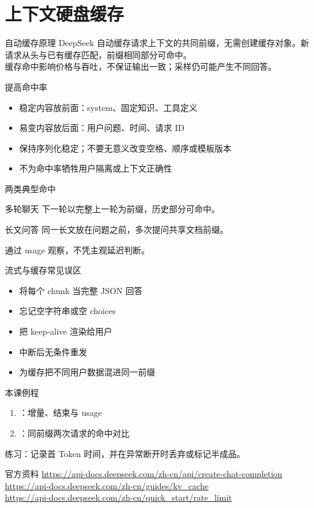 \documentclass[aspectratio=169,UTF8]{ctexbeamer}
\begin{document}
\section{上下文硬盘缓存}
\begin{frame}{自动缓存原理}
DeepSeek 自动缓存请求上下文的共同前缀，无需创建缓存对象。新请求从头与已有缓存匹配，前缀相同部分可命中。\\[8pt]
缓存命中影响价格与吞吐，不保证输出一致；采样仍可能产生不同回答。
\end{frame}
\begin{frame}{提高命中率}
\begin{itemize}
  \item 稳定内容放前面：system、固定知识、工具定义
  \item 易变内容放后面：用户问题、时间、请求 ID
  \item 保持序列化稳定；不要无意义改变空格、顺序或模板版本
  \item 不为命中率牺牲用户隔离或上下文正确性
\end{itemize}
\end{frame}
\begin{frame}{两类典型命中}
\begin{block}{多轮聊天}
下一轮以完整上一轮为前缀，历史部分可命中。
\end{block}
\begin{block}{长文问答}
同一长文放在问题之前，多次提问共享文档前缀。
\end{block}
通过 usage 观察，不凭主观延迟判断。
\end{frame}
\begin{frame}{流式与缓存常见误区}
\begin{itemize}
  \item 将每个 chunk 当完整 JSON 回答
  \item 忘记空字符串或空 choices
  \item 把 keep-alive 渲染给用户
  \item 中断后无条件重发
  \item 为缓存把不同用户数据混进同一前缀
\end{itemize}
\end{frame}
\begin{frame}{本课例程}
\begin{enumerate}
  \item {}：增量、结束与 usage
  \item {}：同前缀两次请求的命中对比
\end{enumerate}
练习：记录首 Token 时间，并在异常断开时丢弃或标记半成品。
\end{frame}
\begin{frame}{官方资料}
\small
\url{https://api-docs.deepseek.com/zh-cn/api/create-chat-completion}\\
\url{https://api-docs.deepseek.com/zh-cn/guides/kv_cache}\\
\url{https://api-docs.deepseek.com/zh-cn/quick_start/rate_limit}
\end{frame}
\end{document}
